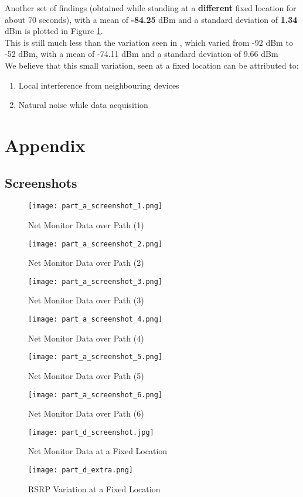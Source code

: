 \documentclass[11pt, fleqn]{article}
\begin{document}
Another set of findings (obtained while standing at a \textbf{different} fixed location for about 70 seconds), with a mean of \textbf{-84.25} dBm and a standard deviation of \textbf{1.34} dBm is plotted in Figure \ref{fig:part_d_extra}. \\

This is still much less than the variation seen in , which varied from -92 dBm to -52 dBm, with a mean of -74.11 dBm and a standard deviation of 9.66 dBm\\

We believe that this small variation, seen at a fixed location can be attributed to:
\begin{enumerate}[itemsep=-1ex]
    \item Local interference from neighbouring devices
    \item Natural noise while data acquisition 
\end{enumerate}


\newpage
\section*{Appendix}
\setcounter{equation}{0}

\subsection*{Screenshots}
\begin{figure}[H]
    \centering
    \texttt{[image: part\_a\_screenshot\_1.png]}
    \caption{Net Monitor Data over Path (1)}
\end{figure}
\begin{figure}[H]
    \centering
    \texttt{[image: part\_a\_screenshot\_2.png]}
    \caption{Net Monitor Data over Path (2)}
\end{figure}
\begin{figure}[H]
    \centering
    \texttt{[image: part\_a\_screenshot\_3.png]}
    \caption{Net Monitor Data over Path (3)}
\end{figure}
\begin{figure}[H]
    \centering
    \texttt{[image: part\_a\_screenshot\_4.png]}
    \caption{Net Monitor Data over Path (4)}
\end{figure}
\begin{figure}[H]
    \centering
    \texttt{[image: part\_a\_screenshot\_5.png]}
    \caption{Net Monitor Data over Path (5)}
\end{figure}
\begin{figure}[H]
    \centering
    \texttt{[image: part\_a\_screenshot\_6.png]}
    \caption{Net Monitor Data over Path (6)}
\end{figure}
\begin{figure}[H]
    \centering
    \texttt{[image: part\_d\_screenshot.jpg]}
    \caption{Net Monitor Data at a Fixed Location}
\end{figure}

\begin{figure}[H]
    \centering
    \texttt{[image: part\_d\_extra.png]}
    \caption{RSRP Variation at a Fixed Location}
    \label{fig:part_d_extra}
\end{figure}
\end{document}
